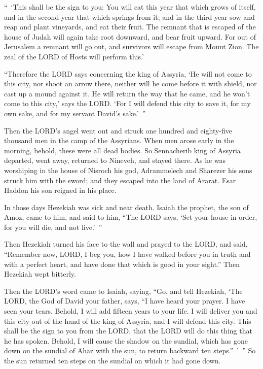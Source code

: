 \myverse{}“ ‘This shall be the sign to you: You will eat this year that
which grows of itself, and in the second year that which springs from it; and in the third year sow and
reap and plant vineyards, and eat their fruit.
\myverse{}The remnant that is escaped of the house of Judah will again take root downward,
and bear fruit upward.
\myverse{}For out of Jerusalem a remnant will go out, and survivors will escape from
Mount Zion. The zeal of the LORD of Hosts will perform this.’

\myverse{}“Therefore the LORD says concerning the king of Assyria, ‘He
will not come to this city, nor shoot an arrow there, neither will he come before it with shield, nor
cast up a mound against it.
\myverse{}He will return the way that he came, and he won’t come to this city,’ says
the LORD.
\myverse{}‘For I will defend this city to save it, for my own sake, and for my servant
David’s sake.’ ”

\myverse{}Then the LORD’s angel went out and struck one hundred and eighty-five
thousand men in the camp of the Assyrians. When men arose early in the morning, behold, these were all
dead bodies.
\myverse{}So Sennacherib king of Assyria departed, went away, returned to Nineveh,
and stayed there.
\myverse{}As he was worshiping in the house of Nisroch his god, Adrammelech and Sharezer
his sons struck him with the sword; and they escaped into the land of Ararat. Esar Haddon his son reigned
in his place.


\mychapter{} \myverse*{}In those days Hezekiah was sick and near death. Isaiah the prophet,
the son of Amoz, came to him, and said to him, “The LORD says, ‘Set your house in order, for you will
die, and not live.’ ”

\myverse{}Then Hezekiah turned his face to the wall and prayed to the LORD,
\myverse{}and said, “Remember now, LORD, I beg you, how I have walked before you in truth
and with a perfect heart, and have done that which is good in your sight.” Then Hezekiah wept bitterly.

\myverse{}Then the LORD’s word came to Isaiah, saying,
\myverse{}“Go, and tell Hezekiah, ‘The LORD, the God of David your father, says, “I have
heard your prayer. I have seen your tears. Behold, I will add fifteen years to your life.
\myverse{}I will deliver you and this city out of the hand of the king of Assyria, and
I will defend this city.
\myverse{}This shall be the sign to you from the LORD, that the LORD will do this thing
that he has spoken.
\myverse{}Behold, I will cause the shadow on the sundial, which has gone down on the
sundial of Ahaz with the sun, to return backward ten steps.” ’ ” So the sun returned ten steps on the sundial
on which it had gone down.

